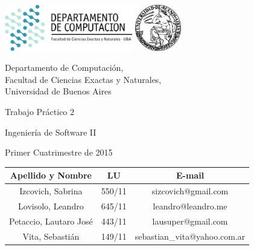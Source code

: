 \documentclass[a4paper, 10pt, twoside]{article}
\newcommand{\titulo}{Trabajo Práctico 2}
\newcommand{\materia}{Ingeniería de Software II}
\newcommand{\cuatrimestre}{Primer Cuatrimestre de 2015}
\begin{document}


\thispagestyle{caratula}

\begin{center}

\includegraphics[height=2cm]{DC.png} 
\hfill
\includegraphics[height=2cm]{UBA.jpg} 

\vspace{2cm}

Departamento de Computación,\\
Facultad de Ciencias Exactas y Naturales,\\
Universidad de Buenos Aires

\vspace{4cm}

\begin{Huge}
\titulo
\end{Huge}

\vspace{0.5cm}

\begin{Large}
\materia
\end{Large}

\vspace{1cm}

\cuatrimestre

\vspace{4cm}

\begin{tabular}{|c|c|c|}
\hline
Apellido y Nombre & LU & E-mail\\
\hline
Izcovich, Sabrina      & 550/11 & sizcovich@gmail.com\\
Lovisolo, Leandro      & 645/11 & leandro@leandro.me\\
Petaccio, Lautaro José & 443/11 & lausuper@gmail.com\\
Vita, Sebastián        & 149/11 & sebastian\_vita@yahoo.com.ar\\
\hline
\end{tabular}

\end{center}
\end{document}
